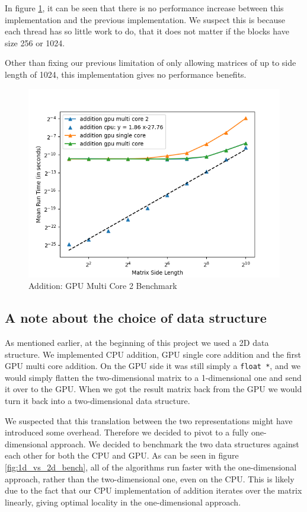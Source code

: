 In figure \ref{fig:addition_gpu_mc_2_bench}, it can be seen that there is no performance increase between this implementation and the previous implementation. We suspect this is because each thread has so little work to do, that it does not matter if the blocks have size 256 or 1024. 

Other than fixing our previous limitation of only allowing matrices of up to side length of 1024, this implementation gives no performance benefits.

\begin{figure}[h]
    \centering
    \includegraphics[width=\textwidth]{SavedBenchmarksAndDiagrams/Machine 2/Addition/CPU, GPU SC, GPU MC 1, GPU MC 2.png}
    \caption{Addition: GPU Multi Core 2 Benchmark}
    \label{fig:addition_gpu_mc_2_bench}
\end{figure}


\subsection{A note about the choice of data structure}

As mentioned earlier, at the beginning of this project we used a 2D data structure. We implemented CPU addition, GPU single core addition and the first GPU multi core addition. On the GPU side it was still simply a \texttt{float *}, and we would simply flatten the two-dimensional matrix to a 1-dimensional one and send it over to the GPU. When we got the result matrix back from the GPU we would turn it back into a two-dimensional data structure. 

We suspected that this translation between the two representations might have introduced some overhead. Therefore we decided to pivot to a fully one-dimensional approach. We decided to benchmark the two data structures against each other for both the CPU and GPU. As can be seen in figure \ref{fig:1d_vs_2d_bench}, all of the algorithms run faster with the one-dimensional approach, rather than the two-dimensional one, even on the CPU. This is likely due to the fact that our CPU implementation of addition iterates over the matrix linearly, giving optimal locality in the one-dimensional approach.

